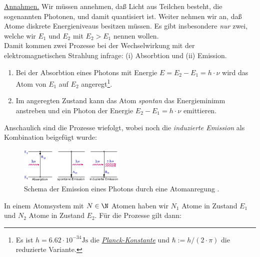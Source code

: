 \documentclass{subfiles}
\begin{document}
                \noindent\underline{Annahmen.} Wir müssen annehmen, daß Licht aus Teilchen besteht, die sogenannten Photonen, und damit quantisiert ist. Weiter nehmen wir an, daß Atome diskrete Energieniveaus besitzen müssen. Es gibt insbesondere \emph{nur} zwei, welche wir $E_1$ und $E_2$ mit $E_2>E_1$ nennen wollen. \\

                Damit kommen zwei Prozesse bei der Wechselwirkung mit der elektromagnetischen Strahlung infrage: (i) Absorbtion und (ii) Emission. \\

                \begin{enumerate}[label=(\roman*)]
                    \item Bei der Absorbtion eines Photons mit Energie $E=E_2-E_1= h\cdot\nu$ wird das Atom von $E_1$ auf $E_2$ angeregt\footnote{Es ist $h=6.62\cdot 10^{-34}\si{\joule\second}$ die \href{https://de.wikipedia.org/wiki/Planck-Konstante}{\emph{Planck-Konstante}} und $\hbar:=h/(2\cdot\pi)$ die reduzierte Variante.}.
                    \item Im angeregten Zustand kann das Atom \emph{spontan} das Energieminimm anstreben und ein Photon der Energie $E_2-E_1=h\cdot\nu$ emittieren.
                \end{enumerate}

                Anschaulich sind die Prozesse wiefolgt, wobei noch die \emph{induzierte Emission} als Kombination beigefügt wurde:
                \begin{figure}
                    \centering
                    \includegraphics[width=5cm]{Bilddateien/AtomPhotonEmission.gif}
                    \caption[short]{Schema der Emission eines Photons durch eine Atomanregung \cite{uniulm:PlanckStrahlung}.}
                \end{figure}
                In einem Atomsystem mit $N\in\N$ Atomen haben wir $N_1$ Atome in Zustand $E_1$ und $N_2$ Atome in Zustand $E_2$. Für die Prozesse gilt dann:\\
\end{document}
